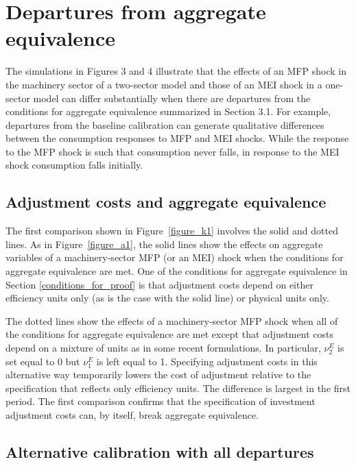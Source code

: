 \documentclass[12pt,fleqn]{article}
\begin{document}
\section{\protect\normalsize Departures from aggregate equivalence}

{\normalsize The simulations in Figures 3 and 4 illustrate that the
effects of an MFP shock in the machinery sector of a two-sector model and
those of an MEI shock in a one-sector model can differ substantially when
there are departures from the conditions for aggregate equivalence
summarized in Section 3.1. For example, departures from the baseline
calibration can generate qualitative differences between the consumption
responses to MFP and MEI shocks. While the response to the MFP shock is such
that consumption never falls, in response to the MEI shock consumption falls
initially. }

\subsection{\protect\normalsize Adjustment costs and aggregate equivalence}

The first comparison shown in Figure~\ref{figure_k1} involves the
solid and dotted lines. As in Figure~\ref{figure_a1}, the solid
lines show the effects on aggregate variables of a
machinery-sector MFP (or an MEI) shock when the conditions for
aggregate equivalence are met. One of the conditions for aggregate
equivalence in Section \ref{conditions_for_proof} is that
adjustment costs depend on either efficiency units only (as is the
case with the solid line) or physical units only.

The dotted lines show the effects of a machinery-sector MFP shock
when all of the conditions for aggregate equivalence are met
except that adjustment costs depend on a
mixture of units as in some recent formulations.
In particular, $\nu _{2}^{E}$ is set equal to 0 but $\nu
_{1}^{E}$ is left equal to 1.
Specifying adjustment costs in this alternative way temporarily
lowers the cost of adjustment relative to the specification that
reflects only efficiency units. The difference is largest in the
first period. The first comparison confirms that the specification
of investment adjustment costs can, by itself, break aggregate
equivalence.

\subsection{\protect\normalsize Alternative calibration with all departures}
\end{document}
